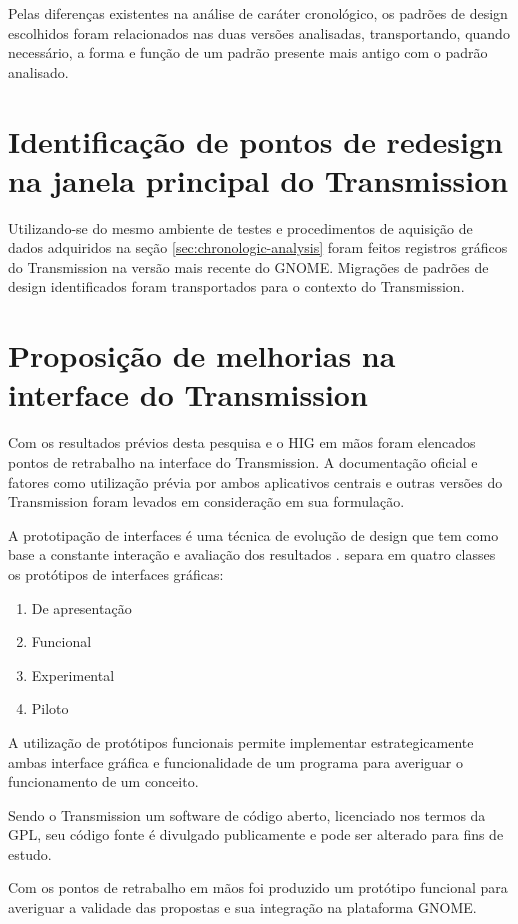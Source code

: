 
Pelas diferenças existentes na análise de caráter cronológico, os padrões de
design escolhidos foram relacionados nas duas versões analisadas, transportando,
quando necessário, a forma e função de um padrão presente mais antigo com o
padrão analisado.

\section{Identificação de pontos de redesign na janela principal do Transmission}

Utilizando-se do mesmo ambiente de testes e procedimentos de aquisição de dados
adquiridos na seção \ref{sec:chronologic-analysis} foram feitos registros
gráficos do Transmission na versão mais recente do GNOME. Migrações de padrões
de design identificados foram transportados para o contexto do Transmission.


\section{Proposição de melhorias na interface do Transmission}

Com os resultados prévios desta pesquisa e o HIG em mãos foram elencados pontos
de retrabalho na interface do Transmission. A documentação oficial e fatores
como utilização prévia por ambos aplicativos centrais e outras versões do
Transmission foram levados em consideração em sua formulação.

A prototipação de interfaces é uma técnica de evolução de design que tem como
base a constante interação e avaliação dos resultados \cite{de2009client}.
 separa em quatro classes os protótipos de
interfaces gráficas:

\begin{enumerate}
  \item De apresentação
  \item Funcional
  \item Experimental
  \item Piloto
\end{enumerate}

A utilização de protótipos funcionais permite implementar estrategicamente ambas
interface gráfica e funcionalidade de um programa para averiguar o funcionamento
de um conceito.

Sendo o Transmission um software de código aberto, licenciado nos termos da GPL,
seu código fonte é divulgado publicamente e pode ser alterado para fins de
estudo.

Com os pontos de retrabalho em mãos foi produzido um protótipo funcional para
averiguar a validade das propostas e sua integração na plataforma GNOME.
